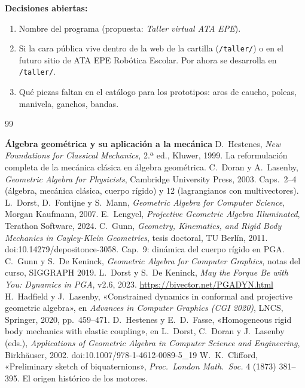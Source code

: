 \documentclass[11pt,a4paper]{article}
\numberwithin{equation}{section}
\begin{document}
\medskip
\textbf{Decisiones abiertas:}
\begin{enumerate}[leftmargin=*]
  \item Nombre del programa (propuesta: \emph{Taller virtual ATA EPE}).
  \item Si la cara pública vive dentro de la web de la cartilla (\texttt{/taller/}) o en el futuro sitio de ATA EPE
        Robótica Escolar. Por ahora se desarrolla en \texttt{/taller/}.
  \item Qué piezas faltan en el catálogo para los prototipos: aros de caucho, poleas, manivela, ganchos, bandas.
\end{enumerate}

\begin{thebibliography}{99}
\small

\item[] \textbf{Álgebra geométrica y su aplicación a la mecánica}
 D.~Hestenes, \emph{New Foundations for Classical Mechanics}, 2.ª ed., Kluwer, 1999.
  La reformulación completa de la mecánica clásica en álgebra geométrica.
 C.~Doran y A.~Lasenby, \emph{Geometric Algebra for Physicists}, Cambridge University
  Press, 2003. Caps.~2--4 (álgebra, mecánica clásica, cuerpo rígido) y 12 (lagrangianos con multivectores).
 L.~Dorst, D.~Fontijne y S.~Mann, \emph{Geometric Algebra for Computer Science},
  Morgan Kaufmann, 2007.
 E.~Lengyel, \emph{Projective Geometric Algebra Illuminated}, Terathon Software, 2024.
 C.~Gunn, \emph{Geometry, Kinematics, and Rigid Body Mechanics in Cayley-Klein Geometries},
  tesis doctoral, TU Berlín, 2011. doi:10.14279/depositonce-3058. Cap.~9: dinámica del cuerpo rígido en PGA.
 C.~Gunn y S.~De Keninck, \emph{Geometric Algebra for Computer Graphics}, notas del curso,
  SIGGRAPH 2019.
 L.~Dorst y S.~De Keninck, \emph{May the Forque Be with You: Dynamics in PGA},
  v2.6, 2023. \url{https://bivector.net/PGADYN.html}
 H.~Hadfield y J.~Lasenby, «Constrained dynamics in conformal and projective geometric
  algebra», en \emph{Advances in Computer Graphics (CGI 2020)}, LNCS, Springer, 2020, pp.~459--471.
 D.~Hestenes y E.~D.~Fasse, «Homogeneous rigid body mechanics with elastic coupling», en
  L.~Dorst, C.~Doran y J.~Lasenby (eds.), \emph{Applications of Geometric Algebra in Computer Science and
  Engineering}, Birkhäuser, 2002. doi:10.1007/978-1-4612-0089-5\_19
 W.~K.~Clifford, «Preliminary sketch of biquaternions», \emph{Proc.\ London Math.\ Soc.} 4 (1873)
  381--395. El origen histórico de los motores.


\end{thebibliography}
\end{document}
